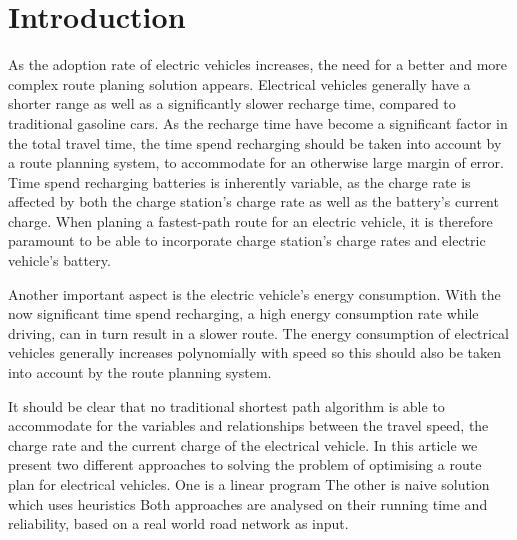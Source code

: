 \section{Introduction}

As the adoption rate of electric vehicles increases, the need for a better and more complex route planing solution appears. Electrical vehicles generally have a shorter range as well as a significantly slower recharge time, compared to traditional gasoline cars. As the recharge time have become a significant factor in the total travel time, the time spend recharging should be taken into account by a route planning system, to accommodate for an otherwise large margin of error. Time spend recharging batteries is inherently variable, as the charge rate is affected by both the charge station's charge rate as well as the battery's current charge. When planing a fastest-path route for an electric vehicle, it is therefore paramount to be able to incorporate charge station's charge rates and electric vehicle's battery\cite{Nobody06}.

Another important aspect is the electric vehicle's energy consumption. With the now significant time spend recharging, a high energy consumption rate while driving, can in turn result in a slower route. The energy consumption of electrical vehicles generally increases polynomially with speed so this should also be taken into account by the route planning system.

It should be clear that no traditional shortest path algorithm is able to accommodate for the variables and relationships between the travel speed, the charge rate and the current charge of the electrical vehicle. In this article we present two different approaches to solving the problem of optimising a route plan for electrical vehicles. One is a linear program
 The other is naive solution which uses heuristics
 Both approaches are analysed on their running time and reliability, based on a real world road network as input.




